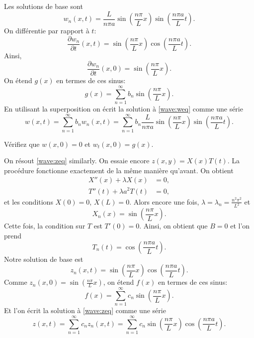 Les solutions de base sont
\begin{equation*}
w_n(x,t) = 
\frac{L}{n \pi a} 
\sin \left( \frac{n \pi}{L} x \right)
\sin \left( \frac{n \pi a}{L} t \right) .
\end{equation*}
On différentie par rapport à $t$:
\begin{equation*}
\frac{\partial w_n}{\partial t}(x,t) = 
\sin \left( \frac{n \pi}{L} x \right)
\cos \left( \frac{n \pi a}{L} t \right) .
\end{equation*}
Ainsi,
\begin{equation*}
\frac{\partial w_n}{\partial t}(x,0) =
\sin \left( \frac{n \pi}{L} x \right) .
\end{equation*}
On étend $g(x)$ en termes de ces sinus:
\begin{equation*}
g(x) =
\sum_{n=1}^\infty b_n \sin \left( \frac{n \pi}{L} x \right) .
\end{equation*}
En utilisant la superposition
on écrit la solution à \eqref{wave:weq} comme une série
\begin{equation*}
w(x,t) =
\sum_{n=1}^\infty
b_n
w_n(x,t)
=
\sum_{n=1}^\infty
b_n
\frac{L}{n \pi a}
\sin \left( \frac{n \pi}{L} x \right)
\sin \left( \frac{n \pi a}{L} t \right) .
\end{equation*}

\begin{exercise}
Vérifiez que $w(x,0) = 0$ et
$w_t(x,0) = g(x)$.
\end{exercise}

On résout \eqref{wave:zeq} similarly.  On essaie encore
$z(x,y) = X(x)T(t)$.  
La procédure fonctionne exactement de la même manière qu'avant.
On obtient
\begin{align*}
X''(x) + \lambda X(x) &= 0 , \\
T''(t) + \lambda a^2 T(t) &= 0 ,
\end{align*}
et les conditions $X(0) = 0$, $X(L) = 0$.  Alors encore une fois, 
$\lambda = \lambda_n = \frac{n^2 \pi^2}{L^2}$ et
\begin{equation*}
X_n(x) = \sin \left( \frac{n \pi}{L} x \right) .
\end{equation*}
Cette fois,  la condition sur $T$ est $T'(0) = 0$.  Ainsi, on obtient que $B = 0$ et l'on prend
\begin{equation*}
T_n(t) = \cos \left( \frac{n \pi a}{L} t \right).
\end{equation*}
Notre solution de base est
\begin{equation*}
z_n(x,t) = 
\sin \left( \frac{n \pi}{L} x \right)
\cos \left( \frac{n \pi a}{L} t \right) .
\end{equation*}
Comme $z_n(x,0) = \sin \left( \frac{n \pi}{L} x \right)$,
on étend $f(x)$ en termes de ces sinus:
\begin{equation*}
f(x) =
\sum_{n=1}^\infty c_n \sin \left( \frac{n \pi}{L} x \right) .
\end{equation*}
Et l'on écrit la solution à \eqref{wave:zeq} comme une série
\begin{equation*}
z(x,t) =
\sum_{n=1}^\infty
c_n
z_n(x,t)
=
\sum_{n=1}^\infty
c_n
\sin \left( \frac{n \pi}{L} x \right)
\cos \left( \frac{n \pi a}{L} t \right) .
\end{equation*}

